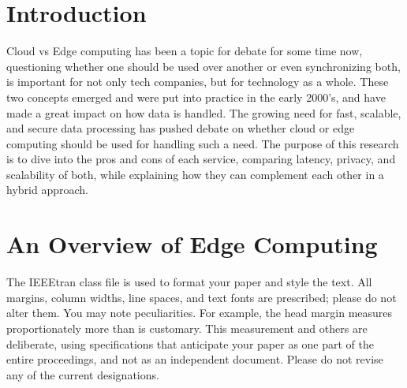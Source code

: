 \documentclass[conference]{IEEEtran}
\begin{document}
\section{Introduction}

Cloud vs Edge computing has been a topic for debate for some time now, questioning whether one should be used over another or even synchronizing both, is important for not only tech companies, but for technology as a whole. These two concepts emerged and were put into practice in the early 2000’s, and have made a great impact on how data is handled. The growing need for fast, scalable, and secure data processing has pushed debate on whether cloud or edge computing should be used for handling such a need. The purpose of this research is to dive into the pros and cons of each service, comparing latency, privacy, and scalability of both, while explaining how they can complement each other in a hybrid approach. 

\section{An Overview of Edge Computing}

The IEEEtran class file is used to format your paper and style the text. All margins, 
column widths, line spaces, and text fonts are prescribed; please do not 
alter them. You may note peculiarities. For example, the head margin
measures proportionately more than is customary. This measurement 
and others are deliberate, using specifications that anticipate your paper 
as one part of the entire proceedings, and not as an independent document. 
Please do not revise any of the current designations.
\end{document}
